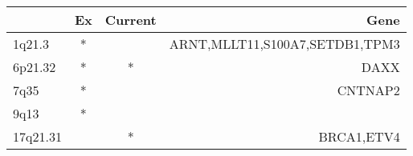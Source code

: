 \begin{tabular}{lccr}
\toprule
{} & Ex & Current &                            Gene \\
\midrule
1q21.3   &  * &         &  ARNT,MLLT11,S100A7,SETDB1,TPM3 \\
6p21.32  &  * &       * &                            DAXX \\
7q35     &  * &         &                         CNTNAP2 \\
9q13     &  * &         &                                 \\
17q21.31 &    &       * &                      BRCA1,ETV4 \\
\bottomrule
\end{tabular}
